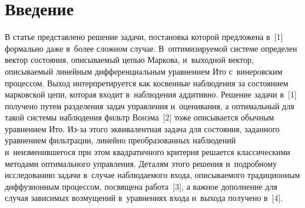
  



\thispagestyle{headings}

\begin{multicols}{2}

\label{st\stat}

\section{Введение}

     В статье представлено решение задачи, постановка которой 
предложена в~[1] формально даже в~более сложном случае. 
В~оптимизируемой системе определен вектор состояния, описываемый 
цепью Маркова, и~выходной вектор, описываемый линейным 
дифференциальным уравнением Ито с~винеровским процессом. Выход 
интерпретируется как косвенные наблюдения за состоянием марковской 
цепи, которая входит в~наблюдения аддитивно. Решение задачи в~[1] 
получено путем разделения задач управления и~оценивания, а оптимальный 
для такой системы наблюдения фильтр Вонэма~[2] тоже описывается 
обычным уравнением Ито. Из-за этого эквивалентная задача для состояния, 
заданного уравнением фильтрации, линейно преобразованных наблюдений 
и~неизменившегося при этом квадратичного критерия решается 
классическими методами оптимального управления. Деталям этого решения и~подробному исследованию задачи в~случае наблюдаемого входа, 
описываемого традиционным диффузионным процессом, посвящена 
работа~[3], а важное дополнение для случая зависимых возмущений 
в~уравнениях входа и~выхода получено в~[4].
     

\end{multicols}
